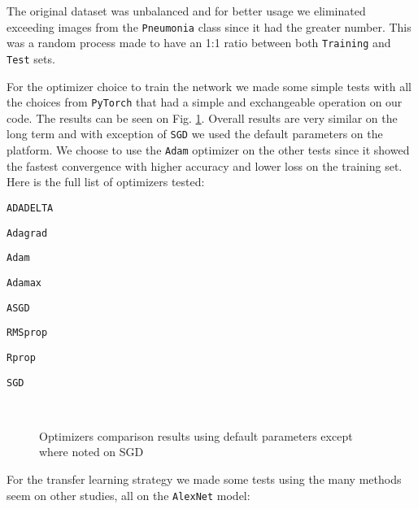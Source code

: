 \documentclass[twocolumn]{article}
\newcommand{\tamfig}{0.9}
\newcommand{\mycite}{\cite}
\begin{document}
The original dataset was unbalanced and for better usage we eliminated exceeding images from the \texttt{Pneumonia} class since it had the greater number. This was a random process made to have an 1:1 ratio between both \texttt{Training} and \texttt{Test} sets.

For the optimizer choice to train the network we made some simple tests with all the choices from \texttt{PyTorch} that had a simple and exchangeable operation on our code. The results can be seen on Fig. \ref{grafico_opt}. Overall results are very similar on the long term and with exception of \texttt{SGD} we used the default parameters on the platform. We choose to use the \texttt{Adam} optimizer on the other tests since it showed the fastest convergence with higher accuracy and lower loss on the training set. Here is the full list of optimizers tested:
\begin{enumerate*}[noitemsep,nolistsep,label={\alph*)}]
\item \texttt{ADADELTA} \mycite{adadelta}
\item \texttt{Adagrad} \mycite{adagrad}
\item \texttt{Adam} \mycite{adam}
\item \texttt{Adamax}
\item \texttt{ASGD} \mycite{asgd}
\item \texttt{RMSprop} \mycite{rmsprop}
\item \texttt{Rprop}
\item \texttt{SGD} \mycite{sgd}
\end{enumerate*}

\begin{figure}[h]
{}
\\
\caption{Optimizers comparison results using default parameters except where noted on SGD}
\label{grafico_opt}
\end{figure}


For the transfer learning strategy we made some tests using the many methods seem on other studies, all on the \texttt{AlexNet} model:
\end{document}

